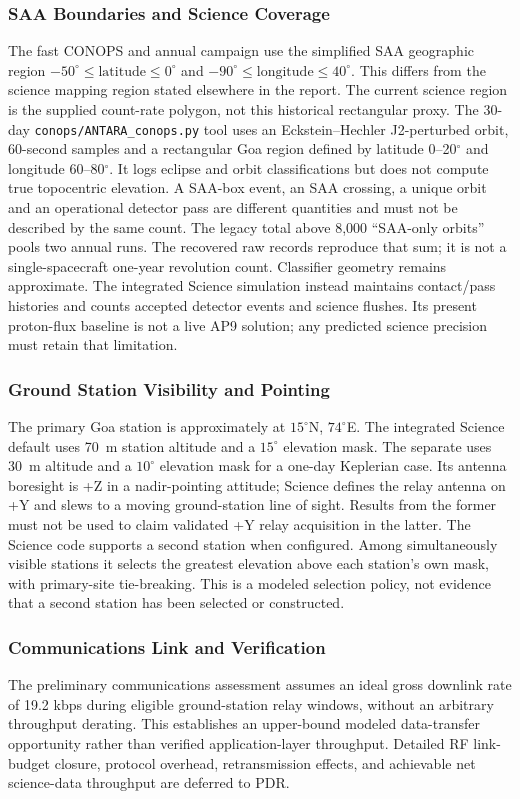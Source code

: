 \subsubsection{SAA Boundaries and Science Coverage}\label{app:saa-support}
The fast CONOPS and annual campaign use the simplified SAA geographic region $-50^\circ\leq\mathrm{latitude}\leq0^\circ$ and $-90^\circ\leq\mathrm{longitude}\leq40^\circ$. This differs from the science mapping region stated elsewhere in the report. The current science region is the supplied count-rate polygon, not this historical rectangular proxy.
The 30-day \texttt{conops/ANTARA\_conops.py} tool uses an Eckstein--Hechler J2-perturbed orbit, 60-second samples and a rectangular Goa region defined by latitude 0--20$^\circ$ and longitude 60--80$^\circ$. It logs eclipse and orbit classifications but does not compute true topocentric elevation. A SAA-box event, an SAA crossing, a unique orbit and an operational detector pass are different quantities and must not be described by the same count. The legacy total above 8,000 ``SAA-only orbits'' pools two annual runs. The recovered raw records reproduce that sum; it is not a single-spacecraft one-year revolution count. Classifier geometry remains approximate.
The integrated Science simulation instead maintains contact/pass histories and counts accepted detector events and science flushes. Its present proton-flux baseline is not a live AP9 solution; any predicted science precision must retain that limitation.
\subsubsection{Ground Station Visibility and Pointing}\label{app:gs-support}
The primary Goa station is approximately at $15^\circ$N, $74^\circ$E. The integrated Science default uses 70~m station altitude and a $15^\circ$ elevation mask. The separate  uses 30~m altitude and a $10^\circ$ elevation mask for a one-day Keplerian case. Its antenna boresight is +Z in a nadir-pointing attitude; Science defines the relay antenna on +Y and slews to a moving ground-station line of sight. Results from the former must not be used to claim validated +Y relay acquisition in the latter.
The Science code supports a second station when configured. Among simultaneously visible stations it selects the greatest elevation above each station's own mask, with primary-site tie-breaking. This is a modeled selection policy, not evidence that a second station has been selected or constructed.
\subsubsection{Communications Link and Verification}\label{app:rf-link}
The preliminary communications assessment assumes an ideal gross downlink rate of 19.2 kbps during eligible ground-station relay windows, without an arbitrary throughput derating. This establishes an upper-bound modeled data-transfer opportunity rather than verified application-layer throughput. Detailed RF link-budget closure, protocol overhead, retransmission effects, and achievable net science-data throughput are deferred to PDR.


